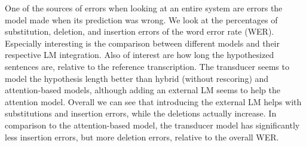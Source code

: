 \documentclass[a4paper]{article}
\begin{document}
One of the sources of errors when looking at an entire system
are errors the model made when its prediction was wrong.
We look at the percentages of substitution, deletion, and insertion errors of the word error rate (WER).
Especially interesting is the comparison between different models and their respective LM integration.
Also of interest are how long the hypothesized sentences are, relative to the reference transcription.
The transducer seems to model the hypothesis length better than hybrid (without rescoring) and attention-based models, although adding an external LM seems to help the attention model.
Overall we can see that introducing the external LM helps with substitutions and insertion errors,
while the deletions actually increase.
In comparison to the attention-based model,
the transducer model has significantly less insertion errors,
but more deletion errors, relative to the overall WER.
\end{document}
